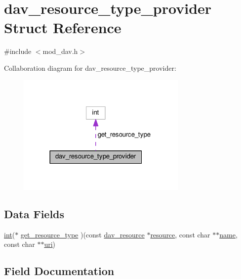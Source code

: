 \hypertarget{structdav__resource__type__provider}{}\section{dav\+\_\+resource\+\_\+type\+\_\+provider Struct Reference}
\label{structdav__resource__type__provider}


{\ttfamily \#include $<$mod\+\_\+dav.\+h$>$}



Collaboration diagram for dav\+\_\+resource\+\_\+type\+\_\+provider\+:
\nopagebreak
\begin{figure}[H]
\begin{center}
\leavevmode
\includegraphics[width=234pt]{structdav__resource__type__provider__coll__graph}
\end{center}
\end{figure}
\subsection*{Data Fields}
\begin{DoxyCompactItemize}
\item 
\hyperlink{pcre_8txt_a42dfa4ff673c82d8efe7144098fbc198}{int}($\ast$ \hyperlink{structdav__resource__type__provider_a5543267e7a44ab16585d5dc563b8b9d6}{get\+\_\+resource\+\_\+type} )(const \hyperlink{structdav__resource}{dav\+\_\+resource} $\ast$\hyperlink{group__APR__Util__RL_gaa6244aacafcc4ec1d0727bdb32614b11}{resource}, const char $\ast$$\ast$\hyperlink{pcre_8txt_a5a15d68aadb41c771fe50a27c400d49b}{name}, const char $\ast$$\ast$\hyperlink{group__APR__Util__XML_ga69ec24fb2d0a5f5e532deb9adaab81d6}{uri})
\end{DoxyCompactItemize}


\subsection{Field Documentation}
